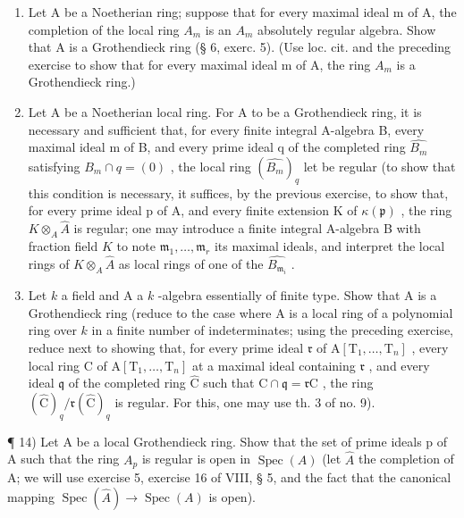 \begin{enumerate}
\def\labelenumi{\arabic{enumi})}
\setcounter{enumi}{10}
\item
  Let A be a Noetherian ring; suppose that for every maximal ideal m of A, the completion of the local ring \(A_{m}\) is an \(A_{m}\) absolutely regular algebra. Show that A is a Grothendieck ring (§ 6, exerc. 5). (Use loc. cit. and the preceding exercise to show that for every maximal ideal m of A, the ring \(A_{m}\) is a Grothendieck ring.)
\item
  Let A be a Noetherian local ring. For A to be a Grothendieck ring, it is necessary and sufficient that, for every finite integral A-algebra B, every maximal ideal m of B, and every prime ideal q of the completed ring \(\widehat{B_{m}}\) satisfying \(B_{m} \cap q = (0)\) , the local ring \((\widehat{B_{m}})_{q}\) let be regular (to show that this condition is necessary, it suffices, by the previous exercise, to show that, for every prime ideal p of A, and every finite extension K of \(\kappa(\mathfrak{p})\) , the ring \(K \otimes_{A} \widehat{A}\) is regular; one may introduce a finite integral A-algebra B with fraction field \(K\) to note \(\mathfrak{m}_{1},\ldots,\mathfrak{m}_{r}\) its maximal ideals, and interpret the local rings of \(K\otimes_{A}\widehat{A}\) as local rings of one of the \(\widehat{B_{\mathfrak{m}_{i}}}\) .
\item
  Let \(k\) a field and A a \(k\) -algebra essentially of finite type. Show that A is a Grothendieck ring (reduce to the case where A is a local ring of a polynomial ring over \(k\) in a finite number of indeterminates; using the preceding exercise, reduce next to showing that, for every prime ideal \(\mathfrak{r}\) of \(\mathrm{A}[\mathrm{T}_1,\ldots ,\mathrm{T}_n]\) , every local ring C of \(\mathrm{A}[\mathrm{T}_1,\ldots ,\mathrm{T}_n]\) at a maximal ideal containing \(\mathfrak{r}\) , and every ideal \(\mathfrak{q}\) of the completed ring \(\widehat{\mathrm{C}}\) such that \(\mathrm{C}\cap \mathfrak{q} = \mathfrak{r}\mathrm{C}\) , the ring \((\widehat{\mathrm{C}})_q / \mathfrak{r}(\widehat{\mathrm{C}})_q\) is regular. For this, one may use th. 3 of no. 9).
\end{enumerate}

¶ 14) Let A be a local Grothendieck ring. Show that the set of prime ideals p of A such that the ring \(A_{p}\) is regular is open in \(\operatorname{Spec}(A)\) (let \(\widehat{A}\) the completion of A; we will use exercise 5, exercise 16 of VIII, § 5, and the fact that the canonical mapping \(\operatorname{Spec}(\widehat{A}) \to \operatorname{Spec}(A)\) is open).

